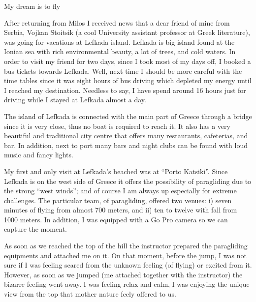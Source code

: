 \documentclass[10pt,a4paper]{article} %
\newcommand{\NewsItem}[1]{ %
\usefont{T1}{fvs}{n}{n} %
\vspace{24pt}\large #1\vspace{3pt} %
\par \normalsize \normalfont}
\begin{document}
\begin{multicols}{3}
\NewsItem{My dream is to fly}

After returning from Milos I received news that a dear friend of mine from Serbia, 
Vojkan Stoitsik (a cool University assistant professor at Greek literature), 
was going for vacations at Lefkada island. 
Lefkada is big island found at the Ionian sea with rich environmental beauty, a lot 
of trees, and cold waters.
In order to visit my friend for two days, since I took most of my days off, I 
booked a bus tickets towards Lefkada. 
Well, next time I should be more careful with the time tables since it was eight hours 
of bus driving which depleted my energy until I reached my destination. 
Needless to say, I have spend around 16 hours just for driving while I stayed at 
Lefkada almost a day. 


The island of Lefkada is connected with the main part of Greece through a bridge 
since it is very close, thus no boat is required to reach it. 
It also has a very beautiful and traditional city centre that offers many 
restaurants, cafeterias, and bar. 
In addition, next to port many bars and night clubs can be found with loud 
music and fancy lights. 


My first and only visit at Lefkada's beached was at ``Porto Katsiki''. 
Since Lefkada is on the west side of Greece it offers the possibility of 
paragliding due to the strong ``west winds''; and of course I am always up 
especially for extreme challenges. 
The particular team, of paragliding, offered two venues: i) seven minutes of flying 
from almost 700 meters, and ii) ten to twelve with fall from 1000 meters. 
In addition, I was equipped with a Go Pro camera so we can capture the moment. 


As soon as we reached the top of the hill the instructor prepared the paragliding 
equipments and attached me on it. 
On that moment, before the jump, I was not sure if I was feeling scared from the 
unknown feeling (of flying) or excited from it. 
However, as soon as we jumped (me attached together with the instructor) the 
bizarre feeling went away. 
I was feeling relax and calm, I was enjoying the unique view from the top that 
mother nature feely offered to us. 



\end{multicols}
\end{document}
